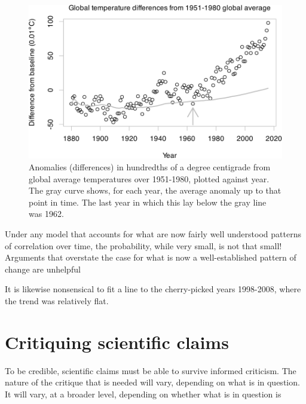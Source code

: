\documentclass[
  10pt,
  b5paper]{book}
\begin{document}
\begin{figure}[H]

{\centering \includegraphics[width=0.8\linewidth]{08-observational_files/figure-latex/climate-1} 

}

\caption{Anomalies (differences) in hundredths of a degree centigrade
from global average temperatures over 1951-1980, plotted against year.
The gray curve shows, for each year, the average anomaly up to that
point in time.  The last year in which this lay below the gray line
was 1962.}\label{fig:climate}
\end{figure}

Under any model that accounts for what are now
fairly well understood patterns of correlation over time,
the probability, while very small, is not that small!
Arguments that overstate the case for what is now a
well-established pattern of change are unhelpful

It is likewise nonsensical to fit a line to the cherry-picked
years 1998-2008, where the trend was relatively flat.

\hypertarget{critiquing-scientific-claims}{%
\chapter{Critiquing scientific claims}\label{critiquing-scientific-claims}}

To be credible, scientific claims must be able to survive
informed criticism. The nature of the critique that is
needed will vary, depending on what is in question.
It will vary, at a broader level, depending on whether
what is in question is
\end{document}
